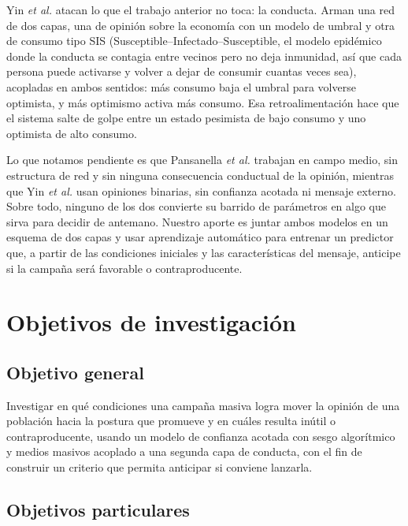 \documentclass[11pt]{article}
\begin{document}
Yin \emph{et al.} \cite{Yin2025} atacan lo que el trabajo anterior no toca: la conducta. Arman una
red de dos capas, una de opinión sobre la economía con un modelo de umbral y otra de consumo tipo
SIS (Susceptible--Infectado--Susceptible, el modelo epidémico donde la conducta se contagia entre
vecinos pero no deja inmunidad, así que cada persona puede activarse y volver a dejar de consumir
cuantas veces sea), acopladas en ambos sentidos: más consumo baja el umbral para volverse
optimista, y más optimismo activa más consumo. Esa retroalimentación hace que el sistema salte de golpe entre un
estado pesimista de bajo consumo y uno optimista de alto consumo.

Lo que notamos pendiente es que Pansanella \emph{et al.} trabajan en campo medio, sin estructura de
red y sin ninguna consecuencia conductual de la opinión, mientras que Yin \emph{et al.} usan
opiniones binarias, sin confianza acotada ni mensaje externo. Sobre todo, ninguno de los dos
convierte su barrido de parámetros en algo que sirva para decidir de antemano. Nuestro aporte es
juntar ambos modelos en un esquema de dos capas y usar aprendizaje automático para entrenar un
predictor que, a partir de las condiciones iniciales y las características del mensaje, anticipe
si la campaña será favorable o contraproducente.

\section*{Objetivos de investigación}

\subsection*{Objetivo general}

Investigar en qué condiciones una campaña masiva logra mover la opinión de una población hacia la
postura que promueve y en cuáles resulta inútil o contraproducente, usando un modelo de confianza
acotada con sesgo algorítmico y medios masivos acoplado a una segunda capa de conducta, con el fin
de construir un criterio que permita anticipar si conviene lanzarla.

\subsection*{Objetivos particulares}
\end{document}
